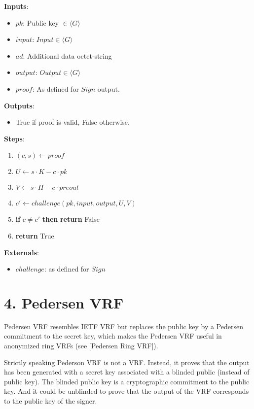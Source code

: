 \documentclass[
]{article}
\providecommand{\tightlist}{%
  \setlength{\itemsep}{0pt}\setlength{\parskip}{0pt}}
\begin{document}
\textbf{Inputs}:

\begin{itemize}
\tightlist
\item
  \(pk\): Public key \(\in \langle G \rangle\)
\item
  \(input\): \(Input \in \langle G \rangle\)
\item
  \(ad\): Additional data octet-string
\item
  \(output\): \(Output \in \langle G \rangle\)
\item
  \(proof\): As defined for \(Sign\) output.
\end{itemize}

\textbf{Outputs}:

\begin{itemize}
\tightlist
\item
  True if proof is valid, False otherwise.
\end{itemize}

\textbf{Steps}:

\begin{enumerate}
\def\labelenumi{\arabic{enumi}.}
\tightlist
\item
  \((c, s) \leftarrow proof\)
\item
  \(U \leftarrow s \cdot K - c \cdot pk\)
\item
  \(V \leftarrow s \cdot H - c \cdot preout\)
\item
  \(c' \leftarrow challenge(pk, input, output, U, V)\)
\item
  \textbf{if} \(c \neq c'\) \textbf{then} \textbf{return} False
\item
  \textbf{return} True
\end{enumerate}

\textbf{Externals}:

\begin{itemize}
\tightlist
\item
  \(challenge\): as defined for \(Sign\)
\end{itemize}

\hypertarget{pedersen-vrf}{%
\section{4. Pedersen VRF}\label{pedersen-vrf}}

Pedersen VRF resembles IETF VRF but replaces the public key by a
Pedersen commitment to the secret key, which makes the Pedersen VRF
useful in anonymized ring VRFs (see {[}Pedersen Ring VRF{]}).

Strictly speaking Pederson VRF is not a VRF. Instead, it proves that the
output has been generated with a secret key associated with a blinded
public (instead of public key). The blinded public key is a
cryptographic commitment to the public key. And it could be unblinded to
prove that the output of the VRF corresponds to the public key of the
signer.
\end{document}
